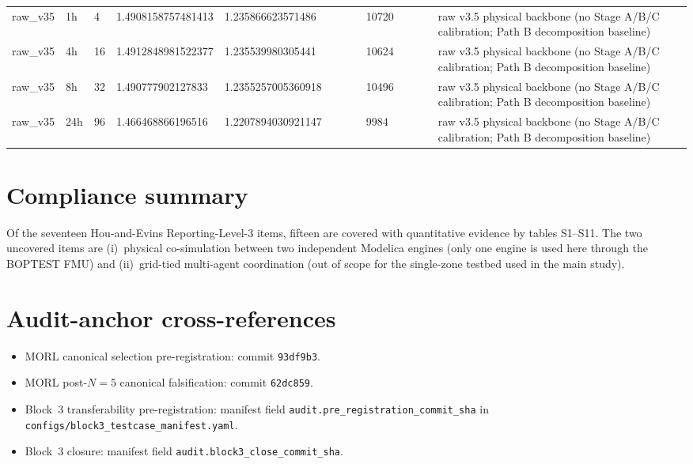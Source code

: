 \documentclass[11pt,a4paper]{article}
\begin{document}
\begin{small}
\begin{longtable}{L{1.27cm} L{1.27cm} L{1.27cm} L{1.27cm} L{1.27cm} L{1.27cm} L{1.27cm} L{1.27cm} L{1.27cm} L{1.27cm} L{1.27cm} L{1.27cm} L{1.27cm}}
raw\_v35 & 1h & 4 & 1.4908158757481413 & 1.235866623571486 &  &  &  & 10720 &  &  &  & raw v3.5 physical backbone (no Stage A/B/C calibration; Path B decomposition baseline) \\
raw\_v35 & 4h & 16 & 1.4912848981522377 & 1.235539980305441 &  &  &  & 10624 &  &  &  & raw v3.5 physical backbone (no Stage A/B/C calibration; Path B decomposition baseline) \\
raw\_v35 & 8h & 32 & 1.490777902127833 & 1.2355257005360918 &  &  &  & 10496 &  &  &  & raw v3.5 physical backbone (no Stage A/B/C calibration; Path B decomposition baseline) \\
raw\_v35 & 24h & 96 & 1.466468866196516 & 1.2207894030921147 &  &  &  & 9984 &  &  &  & raw v3.5 physical backbone (no Stage A/B/C calibration; Path B decomposition baseline) \\
\end{longtable}
\end{small}

\section*{Compliance summary}

Of the seventeen Hou-and-Evins Reporting-Level-3 items, fifteen are
covered with quantitative evidence by tables S1--S11. The two
uncovered items are
(i)~physical co-simulation between two independent Modelica engines
(only one engine is used here through the BOPTEST FMU) and
(ii)~grid-tied multi-agent coordination
(out of scope for the single-zone testbed used in the main study).

\section*{Audit-anchor cross-references}

\begin{itemize}
  \item MORL canonical selection pre-registration:
        commit \texttt{93df9b3}.
  \item MORL post-$N{=}5$ canonical falsification:
        commit \texttt{62dc859}.
  \item Block~3 transferability pre-registration:
        manifest field \texttt{audit.pre\_registration\_commit\_sha} in
        \texttt{configs/block3\_testcase\_manifest.yaml}.
  \item Block~3 closure:
        manifest field \texttt{audit.block3\_close\_commit\_sha}.
\end{itemize}
\end{document}
